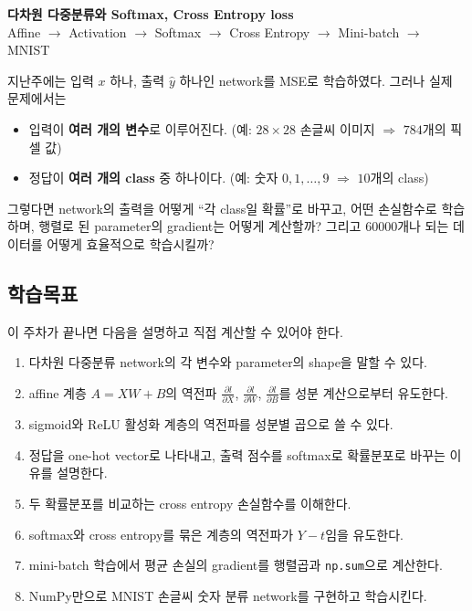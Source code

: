 \documentclass[11pt,a4paper]{article}
\newcommand{\pd}[2]{\frac{\partial #1}{\partial #2}}
\begin{document}

\begin{center}
{\LARGE\bfseries 다차원 다중분류와 Softmax, Cross Entropy loss}\\[0.35em]
{\Large Affine $\rightarrow$ Activation $\rightarrow$ Softmax $\rightarrow$ Cross Entropy
$\rightarrow$ Mini-batch $\rightarrow$ MNIST}\\[0.8em]
\end{center}

\vspace{0.4em}

\begin{keybox}[이번 주의 핵심 질문]
지난주에는 입력 $x$ 하나, 출력 $\widehat y$ 하나인 network를 MSE로 학습하였다.
그러나 실제 문제에서는
\begin{itemize}[leftmargin=1.8em]
\item 입력이 \textbf{여러 개의 변수}로 이루어진다.
(예: $28\times28$ 손글씨 이미지 $\Rightarrow$ $784$개의 픽셀 값)
\item 정답이 \textbf{여러 개의 class} 중 하나이다.
(예: 숫자 $0,1,\ldots,9$ $\Rightarrow$ $10$개의 class)
\end{itemize}
그렇다면 network의 출력을 어떻게 ``각 class일 확률''로 바꾸고,
어떤 손실함수로 학습하며,
행렬로 된 parameter의 gradient는 어떻게 계산할까?
그리고 $60000$개나 되는 데이터를 어떻게 효율적으로 학습시킬까?
\end{keybox}

\subsection*{학습목표}

이 주차가 끝나면 다음을 설명하고 직접 계산할 수 있어야 한다.

\begin{enumerate}[label=\arabic*.]
\item 다차원 다중분류 network의 각 변수와 parameter의 shape을 말할 수 있다.
\item affine 계층 $A=XW+B$의 역전파 $\pd{l}{X}$, $\pd{l}{W}$, $\pd{l}{B}$를 성분 계산으로부터 유도한다.
\item sigmoid와 ReLU 활성화 계층의 역전파를 성분별 곱으로 쓸 수 있다.
\item 정답을 one-hot vector로 나타내고, 출력 점수를 softmax로 확률분포로 바꾸는 이유를 설명한다.
\item 두 확률분포를 비교하는 cross entropy 손실함수를 이해한다.
\item softmax와 cross entropy를 묶은 계층의 역전파가 $Y-t$임을 유도한다.
\item mini-batch 학습에서 평균 손실의 gradient를 행렬곱과 \texttt{np.sum}으로 계산한다.
\item NumPy만으로 MNIST 손글씨 숫자 분류 network를 구현하고 학습시킨다.
\end{enumerate}
\end{document}
